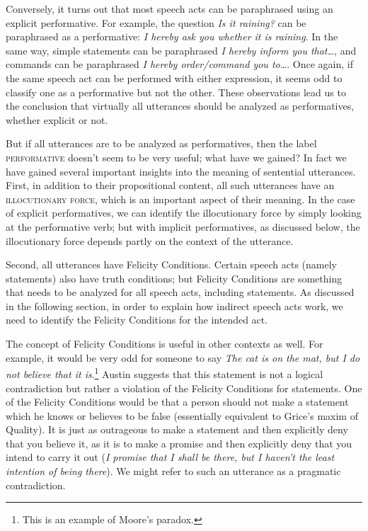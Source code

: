 Conversely, it turns out that most speech acts can be paraphrased using an explicit performative. For example, the question \textit{Is it raining?} can be paraphrased as a performative: \textit{I hereby ask you whether it is raining}. In the same way, simple statements can be paraphrased \textit{I hereby inform you that…}, and commands can be paraphrased \textit{I hereby order/command you to…}. Once again, if the same speech act can be performed with either expression, it seems odd to classify one as a performative but not the other. These observations lead us to the conclusion that virtually all utterances should be analyzed as performatives, whether explicit or not.



But if all utterances are to be analyzed as performatives, then the label \textsc{performative} doesn’t seem to be very useful; what have we gained? In fact we have gained several important insights into the meaning of sentential utterances. First, in addition to their propositional content, all such utterances have an \textsc{illocutionary force}, which is an important aspect of their meaning. In the case of explicit performatives, we can identify the illocutionary force by simply looking at the performative verb; but with implicit performatives, as discussed below, the illocutionary force depends partly on the context of the utterance.



Second, all utterances have Felicity Conditions. Certain speech acts (namely statements) also have truth conditions; but Felicity Conditions are something that needs to be analyzed for all speech acts, including statements. As discussed in the following section, in order to explain how indirect speech acts work, we need to identify the Felicity Conditions for the intended act.



The concept of Felicity Conditions is useful in other contexts as well. For example, it would be very odd for someone to say \textit{The cat is on the mat, but I do not believe that it is}.\footnote{This is an example of Moore’s paradox.} Austin suggests that this statement is not a logical contradiction but rather a violation of the Felicity Conditions for statements. One of the Felicity Conditions would be that a person should not make a statement which he knows or believes to be false (essentially equivalent to Grice’s maxim of Quality). It is just as outrageous to make a statement and then explicitly deny that you believe it, as it is to make a promise and then explicitly deny that you intend to carry it out (\textit{I promise that I shall be there, but I haven’t the least intention of being there}). We might refer to such an utterance as a pragmatic contradiction.



